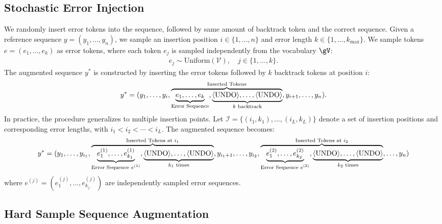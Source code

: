 \subsection{Stochastic Error Injection}
We randomly insert error tokens into the sequence, followed by same amount of backtrack token \bk and the correct sequence.
Given a reference sequence $y = (y_1, \ldots, y_n)$, we sample an insertion position $i \in \{1, \ldots, n\}$ and error length $k \in \{1, \ldots, k_{\max}\}$. 
We sample tokens $e = (e_1, \ldots, e_k)$ as error tokens, where each token $e_j$ is sampled independently from the vocabulary $\gV$:
\begin{align}
    e_j \sim \text{Uniform}(\mathcal{V}), \quad j \in \{1, \ldots, k\}.
\end{align}
The augmented sequence $y^*$ is constructed by inserting the error tokens followed by $k$ backtrack tokens at position $i$:
\begin{align}
    y^* = (y_1, \ldots, y_i, \overbrace{\underbrace{e_1, \ldots, e_k}_{\text{Error Sequence}}, \underbrace{\langle\textnormal{UNDO}\rangle, \dots, \langle\textnormal{UNDO}\rangle}_{\text{$k$ backtrack}}}^\text{Inserted Tokens}, y_{i+1}, \ldots, y_n).
\end{align}
In practice, the procedure generalizes to multiple insertion points. 
Let $\mathcal{I} = \{(i_1, k_1), \ldots, (i_L, k_L)\}$ denote a set of insertion positions and corresponding error lengths, with $i_1 < i_2 < \cdots < i_L$. The augmented sequence becomes:
\begin{align}
    y^* = (y_1, \ldots, y_{i_1}, \overbrace{
    \underbrace{e^{(1)}_1, \ldots, e^{(1)}_{k_1}}_\text{Error Sequence $e^{(1)}$}, 
    \underbrace{\langle\textnormal{UNDO}\rangle, \ldots, \langle\textnormal{UNDO}\rangle}_\text{$k_1$ times}
    }^\text{Inserted Tokens at $i_1$}, y_{i_1+1}, \ldots, y_{i_2}, 
    \overbrace{\underbrace{e^{(2)}_1, \ldots, e^{(2)}_{k_2}}_\text{Error Sequence $e^{(2)}$}, 
    \underbrace{\langle\textnormal{UNDO}\rangle, \ldots, \langle\textnormal{UNDO}\rangle}_\text{$k_2$ times}}^\text{Inserted Tokens at $i_2$}
    ,\ldots, y_n)
\end{align}
where $e^{(j)} = (e^{(j)}_1, \ldots, e^{(j)}_{k_j})$ are independently sampled error sequences.


\subsection{Hard Sample Sequence Augmentation}

